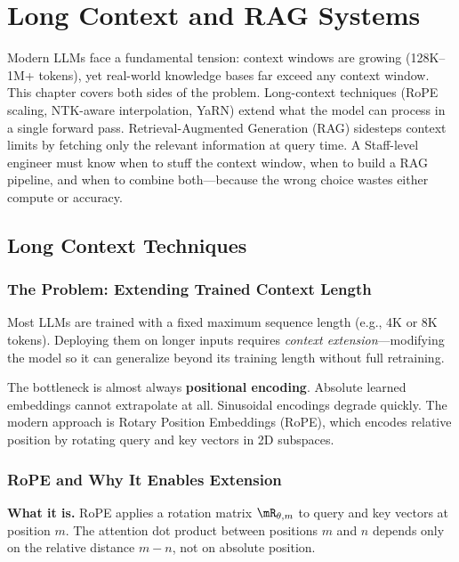 \chapter{Long Context and RAG Systems}
\label{chap:long_context_rag}

\begin{tldr}
Modern LLMs face a fundamental tension: context windows are growing (128K--1M+ tokens), yet real-world knowledge bases far exceed any context window. This chapter covers both sides of the problem. Long-context techniques (RoPE scaling, NTK-aware interpolation, YaRN) extend what the model can process in a single forward pass. Retrieval-Augmented Generation (RAG) sidesteps context limits by fetching only the relevant information at query time. A Staff-level engineer must know when to stuff the context window, when to build a RAG pipeline, and when to combine both---because the wrong choice wastes either compute or accuracy.
\end{tldr}

\section{Long Context Techniques}
\label{sec:long_context}

\subsection{The Problem: Extending Trained Context Length}

Most LLMs are trained with a fixed maximum sequence length (e.g., 4K or 8K tokens). Deploying them on longer inputs requires \textit{context extension}---modifying the model so it can generalize beyond its training length without full retraining.

The bottleneck is almost always \textbf{positional encoding}. Absolute learned embeddings cannot extrapolate at all. Sinusoidal encodings degrade quickly. The modern approach is Rotary Position Embeddings (RoPE), which encodes relative position by rotating query and key vectors in 2D subspaces.

\subsection{RoPE and Why It Enables Extension}

\textbf{What it is.} RoPE applies a rotation matrix $\mR_{\theta, m}$ to query and key vectors at position $m$. The attention dot product between positions $m$ and $n$ depends only on the relative distance $m - n$, not on absolute position.

